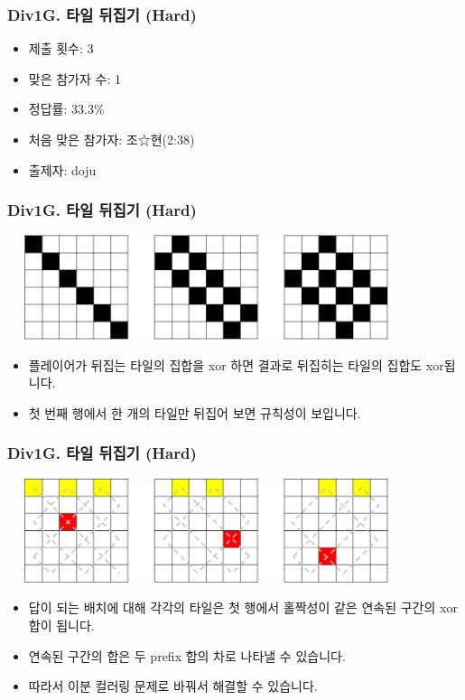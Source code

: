 \documentclass[xetex]{beamer}
\begin{document}
\begin{frame}
  \frametitle{Div1G. 타일 뒤집기 (Hard)}
  \begin{itemize}
    \item 제출 횟수: 3
    \item 맞은 참가자 수: 1
    \item 정답률: 33.3\%
    \item 처음 맞은 참가자: 조☆현(2:38)
    \item 출제자: doju
  \end{itemize}
\end{frame}

\begin{frame}
  \frametitle{Div1G. 타일 뒤집기 (Hard)}
  \begin{center}
    \includegraphics[width=0.8\textwidth]{tile2-sol1.png}
  \end{center}
  \begin{itemize}
    \item 플레이어가 뒤집는 타일의 집합을 xor 하면 결과로 뒤집히는 타일의 집합도 xor됩니다.
    \item 첫 번째 행에서 한 개의 타일만 뒤집어 보면 규칙성이 보입니다.
  \end{itemize}
\end{frame}

\begin{frame}
  \frametitle{Div1G. 타일 뒤집기 (Hard)}
  \begin{center}
    \includegraphics[width=0.8\textwidth]{tile2-sol2.png}
  \end{center}
  \begin{itemize}
    \item 답이 되는 배치에 대해 각각의 타일은 첫 행에서 홀짝성이 같은 연속된 구간의 xor 합이 됩니다.
    \item 연속된 구간의 합은 두 prefix 합의 차로 나타낼 수 있습니다.
    \item 따라서 이분 컬러링 문제로 바꿔서 해결할 수 있습니다.
  \end{itemize}
\end{frame}
\end{document}
